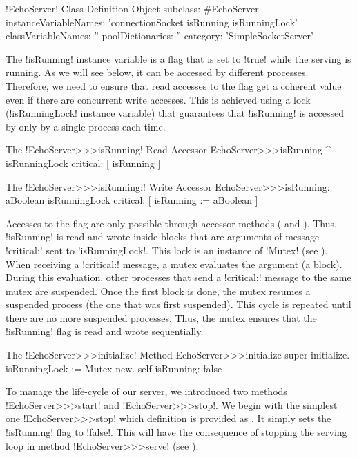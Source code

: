 \documentclass[a4paper,10pt,twoside]{book}
\begin{document}
\begin{classdef}[echoServerClassDef]{\ct!EchoServer! Class Definition}
Object subclass: #EchoServer
	instanceVariableNames: 'connectionSocket isRunning isRunningLock'
	classVariableNames: ''
	poolDictionaries: ''
	category: 'SimpleSocketServer'
\end{classdef}


The \ct!isRunning! instance variable is a flag that is set to \ct!true! while the serving is running.
As we will see below, it can be accessed by different processes.
Therefore, we need to ensure that read accesses to the flag get a coherent value even if there are concurrent write accesses.
This is achieved using a lock (\ct!isRunningLock! instance variable) that guarantees that \ct!isRunning! is accessed by only by a single process each time.

\begin{method}{The \ct!EchoServer>>>isRunning! Read Accessor}
EchoServer>>>isRunning
	^ isRunningLock critical: [ isRunning ]
\end{method}

\begin{method}{The \ct!EchoServer>>>isRunning:! Write Accessor}
EchoServer>>>isRunning: aBoolean
	isRunningLock critical: [ isRunning := aBoolean ]
\end{method}

Accesses to the flag are only possible through accessor methods ( and ).
Thus, \ct!isRunning! is read and wrote inside blocks that are arguments of message \ct!critical:! sent to \ct!isRunningLock!.
This lock is an instance of \ct!Mutex! (see ).
When receiving a \ct!critical:! message, a mutex evaluates the argument (a block).
During this evaluation, other processes that send a \ct!critical:! message to the same mutex are suspended.
Once the first block is done, the mutex resumes a suspended process (the one that was first suspended).
This cycle is repeated until there are no more suspended processes.
Thus, the mutex ensures that the \ct!isRunning! flag is read and wrote sequentially.

\begin{method}{The \ct!EchoServer>>>initialize! Method}
EchoServer>>>initialize 
	super initialize.
	isRunningLock := Mutex new.
	self isRunning: false
\end{method}

To manage the life-cycle of our server, we introduced two methods \ct!EchoServer>>>start! and \ct!EchoServer>>>stop!.
We begin with the simplest one \ct!EchoServer>>>stop! which definition is provided as .
It simply sets the \ct!isRunning! flag to \ct!false!.
This will have the consequence of stopping the serving loop in method \ct!EchoServer>>>serve! (see ). 
\end{document}

